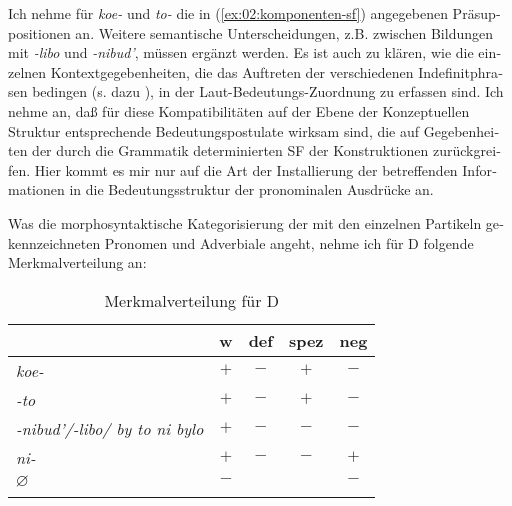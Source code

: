 \documentclass[output=paper, colorlinks, citecolor=brown, booklanguage=german]{langscibook}
\begin{document}
\begin{otherlanguage}{german}
Ich nehme für \textit{koe-} und \textit{to-} die in (\ref{ex:02:komponenten-sf}) angegebenen Präsuppositionen an. Weitere semantische Unterscheidungen, z.B. zwischen Bildungen mit \textit{-libo} und \textit{-nibud'}, müssen ergänzt werden. Es ist auch zu klären, wie die einzelnen Kontextgegebenheiten, die das Auftreten der verschiedenen Indefinitphrasen bedingen (s. dazu \citealt{zi02:Isacenko1962,Dahl1970,Krizkova1971,Ruzicka1973,Ruzicka2000,Paduceva1985,Seliverstova1988,Haspelmath1993,Blaszczak2000}), in der Laut-Be\-deu\-tungs-Zu\-ord\-nung zu erfassen sind. Ich nehme an, daß für diese Kompatibi\-li\-täten auf der Ebene der Konzeptuellen Struktur entsprechende Bedeutungs\-po\-stu\-la\-te wirksam sind, die auf Gegebenheiten der durch die Grammatik determinierten SF der Konstruktionen zurückgreifen. Hier kommt es mir nur auf die Art der Installierung der betreffenden Informationen in die Bedeutungsstruktur der pronominalen Ausdrücke an.

Was die morphosyntaktische Kategorisierung der mit den einzelnen Partikeln gekennzeichneten Pronomen und Adverbiale angeht, nehme ich für D folgende Merkmalverteilung an:


\begin{table}
\caption{Merkmalverteilung für D}
\label{tab:zi02:1}
\begin{tabular}{lcccc}
\lsptoprule
        &w  &def    &spez   &neg\\
\midrule
\textit{koe-}   &$+$    &$-$    &$+$    &$-$\\
\textit{-to}    &$+$    &$-$    &$+$    &$-$\\                       \textit{-nibud'/-libo/ by to ni bylo}  &$+$    &$-$    &$-$    &$-$\\   
\textit{ni-}    &$+$    &$-$    &$-$    &$+$\\                       $\varnothing$  &$-$    &    &    &$-$\\ 
\lspbottomrule
\end{tabular}
\end{table}


\end{otherlanguage}
\end{document}
